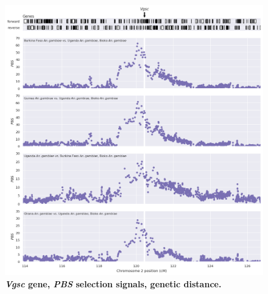\documentclass[a4paper,11pt,abstracton,hidelinks]{scrartcl}
\begin{document}
\begin{figure}[t!]
	\begin{center}
		\includegraphics*[width=1.1\linewidth,center]{artwork/locus_vgsc_pbs_gdist.png}
	\end{center}
	\caption[\textit{Vgsc} gene, \textit{PBS} selection signals, genetic distance]{
	\textbf{\textit{Vgsc} gene, \textit{PBS} selection signals, genetic distance.}
	} 
	\label{fig:locus_vgsc_pbs_gdist}
\end{figure}


\clearpage
\end{document}
